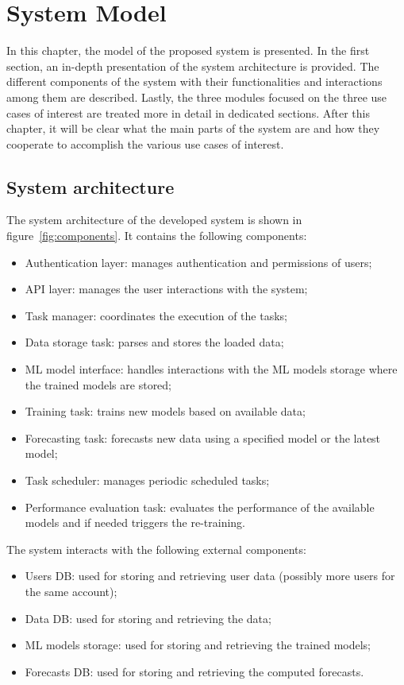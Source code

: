 \chapter{System Model}
\label{cha:system}
\vspace{0.4 cm}

In this chapter, the model of the proposed system is presented.
In the first section, an in-depth presentation of the system architecture is provided.
The different components of the system with their functionalities and interactions among them are described.
Lastly, the three modules focused on the three use cases of interest are treated more in detail in dedicated sections.
After this chapter, it will be clear what the main parts of the system are and how they cooperate to accomplish the various use cases of interest.


\section{System architecture}
\label{sec:architecture}
\vspace{0.2 cm}

The system architecture of the developed system is shown in figure~\ref{fig:components}.
It contains the following components:
\begin{itemize}
  \item Authentication layer: manages authentication and permissions of users;
  \item API layer: manages the user interactions with the system;
  \item Task manager: coordinates the execution of the tasks;
  \item Data storage task: parses and stores the loaded data;
  \item ML model interface: handles interactions with the ML models storage where the trained models are stored;
  \item Training task: trains new models based on available data;
  \item Forecasting task: forecasts new data using a specified model or the latest model;
  \item Task scheduler: manages periodic scheduled tasks;
  \item Performance evaluation task: evaluates the performance of the available models and if needed triggers the re-training.
\end{itemize}

The system interacts with the following external components:
\begin{itemize}
  \item Users DB: used for storing and retrieving user data (possibly more users for the same account);
  \item Data DB: used for storing and retrieving the data;
  \item ML models storage: used for storing and retrieving the trained models;
  \item Forecasts DB: used for storing and retrieving the computed forecasts.
\end{itemize}

